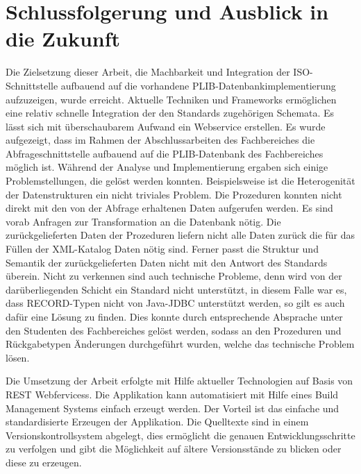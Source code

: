 \chapter*{Schlussfolgerung und Ausblick in die Zukunft}


Die Zielsetzung dieser Arbeit, die Machbarkeit und Integration der ISO-Schnittstelle aufbauend auf die vorhandene PLIB-Datenbankimplementierung aufzuzeigen, wurde erreicht. Aktuelle Techniken und Frameworks ermöglichen eine relativ schnelle Integration der den Standards zugehörigen Schemata. Es lässt sich mit überschaubarem Aufwand ein \gls{Webservice} erstellen. 
Es wurde aufgezeigt, dass im Rahmen der Abschlussarbeiten des Fachbereiches die Abfrageschnittstelle aufbauend auf die PLIB-Datenbank des Fachbereiches möglich ist. Während der Analyse und Implementierung ergaben sich einige Problemstellungen, die gelöst werden konnten. Beispielsweise ist die Heterogenität der Datenstrukturen ein nicht triviales Problem. Die Prozeduren konnten nicht direkt mit den von der Abfrage erhaltenen Daten aufgerufen werden. Es sind vorab Anfragen zur Transformation an die Datenbank nötig. 
Die zurückgelieferten Daten der Prozeduren liefern nicht alle Daten zurück die für das Füllen der XML-Katalog Daten nötig sind. Ferner passt die Struktur und Semantik der zurückgelieferten Daten nicht mit den Antwort des Standards überein. Nicht zu verkennen sind auch technische Probleme, denn wird von der darüberliegenden Schicht ein Standard nicht unterstützt, in diesem Falle war es, dass RECORD-Typen nicht von Java-JDBC unterstützt werden, so gilt es auch dafür eine Lösung zu finden. 
Dies konnte durch entsprechende Absprache unter den Studenten des Fachbereiches gelöst werden, sodass an den Prozeduren und Rückgabetypen Änderungen durchgeführt wurden, welche das technische Problem lösen.

Die Umsetzung der Arbeit erfolgte mit Hilfe aktueller Technologien auf Basis von \gls{REST} \glspl{Webfervices}. Die Applikation kann automatisiert mit Hilfe eines Build Management Systems einfach erzeugt werden. Der Vorteil ist das einfache und standardisierte Erzeugen der Applikation. Die Quelltexte sind in einem Versionskontrollsystem abgelegt, dies ermöglicht die genauen Entwicklungsschritte zu verfolgen und gibt die Möglichkeit auf ältere Versionsstände zu blicken oder diese zu erzeugen. 

